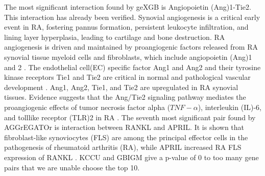 \documentclass[11pt]{article}
\theoremstyle{plain}
\theoremstyle{definition}
\theoremstyle{remark}
\begin{document}
\noindent The most significant interaction found by geXGB is Angiopoietin (Ang)1-Tie2. This interaction has already been verified. Synovial angiogenesis is a critical early event in RA, fostering pannus formation, persistent leukocyte infiltration, and lining layer hyperplasia, leading to cartilage and bone destruction\cite{14,15}. RA angiogenesis is driven and maintained by proangiogenic factors released from RA synovial tissue myeloid cells and fibroblasts, which include angiopoietin (Ang)1 and 2 \cite{16,17}. The endothelial cell(EC) specific factor Ang1 and Ang2 and their tyrosine kinase receptors Tie1 and Tie2 are critical in normal and pathological vascular development \cite{18}. Ang1, Ang2, Tie1, and Tie2 are upregulated in RA synovial tissues. Evidence suggests that the Ang/Tie2 signaling pathway mediates the proangiogenic effects of tumor necrosis factor alpha ($TNF-\alpha$), interleukin (IL)-6, and tolllike receptor (TLR)2 in RA \cite{17,19}. The seventh most significant pair found by AGGrEGATOr is interaction between RANKL and APRIL. It is shown that fibroblast-like synoviocytes (FLS) are among the principal effector cells in the pathogenesis of rheumatoid arthritis (RA), while APRIL increased RA FLS expression of RANKL \cite{20}. KCCU and GBIGM give a p-value of 0 to too many gene pairs that we are unable choose the top 10. \\
\end{document}
